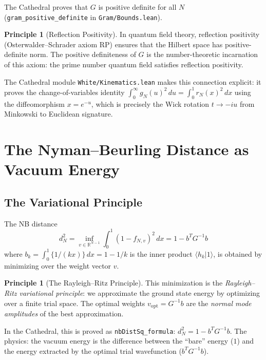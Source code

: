\documentclass[11pt,a4paper]{article}
\theoremstyle{definition}
\newtheorem{principle}[definition]{Principle}
\newcommand{\RR}{\mathbb{R}}
\newcommand{\fract}[1]{\{#1\}}
\newcommand{\lean}[1]{\texttt{#1}}
\newcommand{\braket}[2]{\langle #1 | #2 \rangle}
\begin{document}
The Cathedral proves that $G$ is positive definite for all $N$
(\lean{gram\_positive\_definite} in \lean{Gram/Bounds.lean}).

\begin{principle}[Reflection Positivity]
In quantum field theory, reflection positivity (Osterwalder--Schrader
axiom RP) ensures that the Hilbert space has positive-definite norm.
The positive definiteness of $G$ is the number-theoretic incarnation
of this axiom: the prime number quantum field satisfies reflection
positivity.

The Cathedral module \lean{White/Kinematics.lean} makes this connection
explicit: it proves the change-of-variables identity
$\int_0^\infty g_N(u)^2\,du = \int_0^1 r_N(x)^2\,dx$
using the diffeomorphism $x = e^{-u}$, which is precisely the
Wick rotation $t \to -iu$ from Minkowski to Euclidean signature.
\end{principle}

\section{The Nyman--Beurling Distance as Vacuum Energy}
\label{sec:vacuum}

\subsection{The Variational Principle}

The NB distance
\[
  d_N^2 = \inf_{v \in \RR^{N-1}} \int_0^1 (1 - f_{N,v})^2\,dx
  = 1 - b^T G^{-1} b
\]
where $b_k = \int_0^1 \fract{1/(kx)}\,dx = 1 - 1/k$ is the inner product
$\braket{h_k}{1}$, is obtained by minimizing over the weight vector $v$.

\begin{principle}[The Rayleigh--Ritz Principle]
This minimization is the \emph{Rayleigh--Ritz variational principle}:
we approximate the ground state energy by optimizing over a finite
trial space. The optimal weights $v_{\mathrm{opt}} = G^{-1}b$ are the
\emph{normal mode amplitudes} of the best approximation.

In the Cathedral, this is proved as \lean{nbDistSq\_formula}:
$d_N^2 = 1 - b^T G^{-1} b$. The physics: the vacuum energy is the
difference between the ``bare'' energy ($1$) and the energy extracted
by the optimal trial wavefunction ($b^T G^{-1} b$).
\end{principle}
\end{document}
